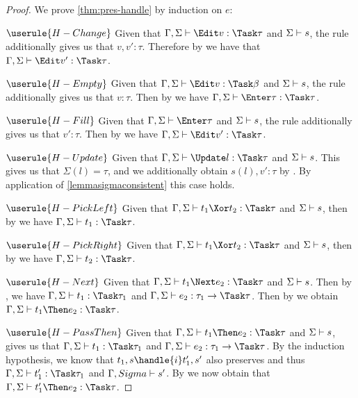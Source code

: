 \begin{proof}
  We prove \cref{thm:pres-handle} by induction on $e$:

  \case
    {$\userule{H-Change}$}
    {Given that $\Gamma,\Sigma\infers\Edit v:\Task\tau$ and $\Sigma\vdash s$, the  rule additionally gives us that $v,v':\tau$. Therefore by  we have that $\Gamma,\Sigma\infers\Edit v':\Task\tau$.}

  \case
    {$\userule{H-Empty}$}
    {Given that $\Gamma,\Sigma\infers\Edit v:\Task\beta$ and $\Sigma\vdash s$, the  rule additionally gives us that $v:\tau$.
    Then by  we have $\Gamma,\Sigma\infers\Enter \tau:\Task\tau$.}

  \case
    {$\userule{H-Fill}$}
    {Given that $\Gamma,\Sigma\infers\Enter\tau$ and $\Sigma\vdash s$, the  rule additionally gives us that $v':\tau$.
    Then by  we have $\Gamma,\Sigma\infers \Edit v':\Task\tau$.}

  \case
    {$\userule{H-Update}$}
    {Given that $\Gamma,\Sigma\infers\Update l:\Task\tau$ and $\Sigma\vdash s$.
    This gives us that $\Sigma(l)=\tau$, and we additionally obtain $s(l),v':\tau$ by .
    By application of \cref{lemmasigmaconsistent} this case holds.}

  \case
    {$\userule{H-PickLeft}$}
    {Given that $\Gamma,\Sigma\infers t_1\Xor t_2:\Task\tau$ and $\Sigma\vdash s$,
    then by  we have $\Gamma,\Sigma\infers t_1:\Task \tau$.}

  \case
    {$\userule{H-PickRight}$}
    {Given that $\Gamma,\Sigma\infers t_1\Xor t_2:\Task\tau$ and $\Sigma\vdash s$,
    then by  we have $\Gamma,\Sigma\infers t_2:\Task \tau$.}

  \case
    {$\userule{H-Next}$}
    {Given that $\Gamma,\Sigma\infers t_1\Next e_2 :\Task\tau$ and $\Sigma\vdash s$.
    Then by , we have $\Gamma,\Sigma\infers t_1:\Task\tau_1$ and $\Gamma,\Sigma\infers e_2:\tau_1\to\Task\tau$.
    Then by  we obtain $\Gamma,\Sigma\infers t_1\Then e_2:\Task\tau$.}

  \case
    {$\userule{H-PassThen}$}
    {Given that $\Gamma,\Sigma\infers t_1\Then e_2:\Task\tau$ and $\Sigma\vdash s$,
     gives us that $\Gamma,\Sigma\infers t_1:\Task\tau_1$ and $\Gamma,\Sigma\infers e_2:\tau_1\to\Task\tau$.
    By the induction hypothesis, we know that $t_1,s\handle{i}t_1',s'$ also preserves and thus $\Gamma,\Sigma\infers t_1':\Task\tau_1$ and $\Gamma,Sigma\vdash s'$.
    By  we now obtain that $\Gamma,\Sigma\infers t_1'\Then e_2:\Task\tau$.}


\end{proof}
